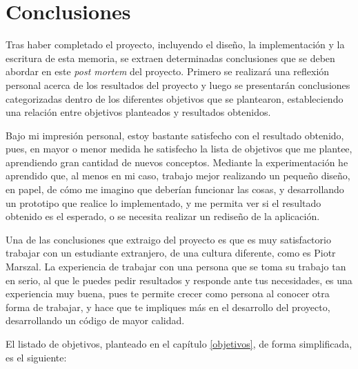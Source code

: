 \chapter{Conclusiones}
\label{conclusiones}

Tras haber completado el proyecto, incluyendo el diseño, la implementación y la escritura de esta memoria, se extraen determinadas conclusiones que se deben abordar en este \textit{post mortem} del proyecto. Primero se realizará una reflexión personal acerca de los resultados del proyecto y luego se presentarán conclusiones categorizadas dentro de los diferentes objetivos que se plantearon, estableciendo una relación entre objetivos planteados y resultados obtenidos.

Bajo mi impresión personal, estoy bastante satisfecho con el resultado obtenido, pues, en mayor o menor medida he satisfecho la lista de objetivos que me plantee, aprendiendo gran cantidad de nuevos conceptos. Mediante la experimentación he aprendido que, al menos en mi caso, trabajo mejor realizando un pequeño diseño, en papel, de cómo me imagino que deberían funcionar las cosas, y desarrollando un prototipo que realice lo implementado, y me permita ver si el resultado obtenido es el esperado, o se necesita realizar un rediseño de la aplicación.

Una de las conclusiones que extraigo del proyecto es que es muy satisfactorio trabajar con un estudiante extranjero, de una cultura diferente, como es Piotr Marszal. La experiencia de trabajar con una persona que se toma su trabajo tan en serio, al que le puedes pedir resultados y responde ante tus necesidades, es una experiencia muy buena, pues te permite crecer como persona al conocer otra forma de trabajar, y hace que te impliques más en el desarrollo del proyecto, desarrollando un código de mayor calidad.

El listado de objetivos, planteado en el capítulo \ref{objetivos}, de forma simplificada, es el siguiente:

